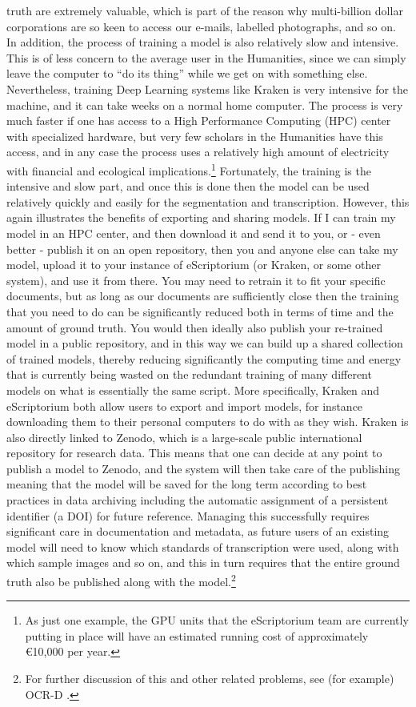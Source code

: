 truth are extremely valuable, which is part of the reason why multi-billion
dollar corporations are so keen to access our e-mails, labelled photographs,
and so on. In addition, the process of training a model is also relatively slow
and intensive. This is of less concern to the average user in the Humanities,
since we can simply leave the computer to “do its thing” while we get on with
something else. Nevertheless, training Deep Learning systems like Kraken is
very intensive for the machine, and it can take weeks on a normal home
computer. The process is very much faster if one has access to a High
Performance Computing (HPC) center with specialized hardware, but very few
scholars in the Humanities have this access, and in any case the process uses a
relatively high amount of electricity with financial and
ecological implications.\footnote{As just one example, the GPU units that the
eScriptorium team are currently putting in place will have an estimated running
cost of approximately €10,000 per year.} Fortunately, the training is the
intensive and slow part, and once this is done then the model can be used
relatively quickly and easily for the segmentation and transcription. However,
this again illustrates the benefits of exporting and sharing models. If I can
train my model in an HPC center, and then download it and send it to you, or -
even better - publish it on an open repository, then you and anyone else can
take my model, upload it to your instance of eScriptorium (or Kraken, or some
other
system), and use it from there. You may need to retrain it to fit your specific
documents, but as long as our documents are sufficiently close then the
training that you need to do can be significantly reduced both in terms of time
and the amount of ground truth. You would then ideally also publish your
re-trained model in a public repository, and in this way we can build up a
shared collection of trained models, thereby reducing significantly the
computing time and energy that is currently being wasted on the redundant
training of many different models on what is essentially the same script. More
specifically, Kraken and eScriptorium both allow users to export and import
models, for instance downloading them to their personal computers to do with as
they wish. Kraken is also directly linked to Zenodo, which is a large-scale
public international repository for research data. This means that one can
decide at any point to publish a model to Zenodo, and the system will then take
care of the publishing meaning that the model will be saved for the long term
according to best practices in data archiving including the automatic
assignment of a persistent identifier (a DOI) for future reference. Managing
this successfully requires significant care in documentation and metadata, as
future users of an existing model will need to know which standards of
transcription were used, along with which sample images and so on, and this in
turn requires that the entire ground truth also be published along with the
model.\footnote{For further discussion of this and other related problems, see
(for example) OCR-D \cite{ocrdtrans}.}

